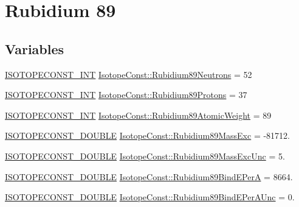 \hypertarget{group___isotope_const-_rubidium-_rb89}{}\section{Rubidium 89}
\label{group___isotope_const-_rubidium-_rb89}
\subsection*{Variables}
\begin{DoxyCompactItemize}
\item 
\mbox{\hyperlink{group___isotope_const-_macros_ga5f18360b3e99483a35c32d789e62621c}{I\+S\+O\+T\+O\+P\+E\+C\+O\+N\+S\+T\+\_\+\+I\+NT}} \mbox{\hyperlink{group___isotope_const-_rubidium-_rb89_ga145860715b133f1510f7f5de0f035108}{Isotope\+Const\+::\+Rubidium89\+Neutrons}} = 52
\item 
\mbox{\hyperlink{group___isotope_const-_macros_ga5f18360b3e99483a35c32d789e62621c}{I\+S\+O\+T\+O\+P\+E\+C\+O\+N\+S\+T\+\_\+\+I\+NT}} \mbox{\hyperlink{group___isotope_const-_rubidium-_rb89_gac3db2f1571db822d4712837aa1ec4ea5}{Isotope\+Const\+::\+Rubidium89\+Protons}} = 37
\item 
\mbox{\hyperlink{group___isotope_const-_macros_ga5f18360b3e99483a35c32d789e62621c}{I\+S\+O\+T\+O\+P\+E\+C\+O\+N\+S\+T\+\_\+\+I\+NT}} \mbox{\hyperlink{group___isotope_const-_rubidium-_rb89_ga5297d053eb0895f12f3f8f43e9750254}{Isotope\+Const\+::\+Rubidium89\+Atomic\+Weight}} = 89
\item 
\mbox{\hyperlink{group___isotope_const-_macros_ga8f45a7272ce02c0b4c65c44636ed719a}{I\+S\+O\+T\+O\+P\+E\+C\+O\+N\+S\+T\+\_\+\+D\+O\+U\+B\+LE}} \mbox{\hyperlink{group___isotope_const-_rubidium-_rb89_gac2be8a76602d67287d9319547ed3b7f2}{Isotope\+Const\+::\+Rubidium89\+Mass\+Exc}} = -\/81712.
\item 
\mbox{\hyperlink{group___isotope_const-_macros_ga8f45a7272ce02c0b4c65c44636ed719a}{I\+S\+O\+T\+O\+P\+E\+C\+O\+N\+S\+T\+\_\+\+D\+O\+U\+B\+LE}} \mbox{\hyperlink{group___isotope_const-_rubidium-_rb89_gacd1630a53d981a9ee8a3d2732ff4940b}{Isotope\+Const\+::\+Rubidium89\+Mass\+Exc\+Unc}} = 5.
\item 
\mbox{\hyperlink{group___isotope_const-_macros_ga8f45a7272ce02c0b4c65c44636ed719a}{I\+S\+O\+T\+O\+P\+E\+C\+O\+N\+S\+T\+\_\+\+D\+O\+U\+B\+LE}} \mbox{\hyperlink{group___isotope_const-_rubidium-_rb89_gade105eeb24bc4a5169a1c3a5ff9bd296}{Isotope\+Const\+::\+Rubidium89\+Bind\+E\+PerA}} = 8664.
\item 
\mbox{\hyperlink{group___isotope_const-_macros_ga8f45a7272ce02c0b4c65c44636ed719a}{I\+S\+O\+T\+O\+P\+E\+C\+O\+N\+S\+T\+\_\+\+D\+O\+U\+B\+LE}} \mbox{\hyperlink{group___isotope_const-_rubidium-_rb89_gad2289f609ef1776dd4ef3edeeb10a11a}{Isotope\+Const\+::\+Rubidium89\+Bind\+E\+Per\+A\+Unc}} = 0.

\end{DoxyCompactItemize}
